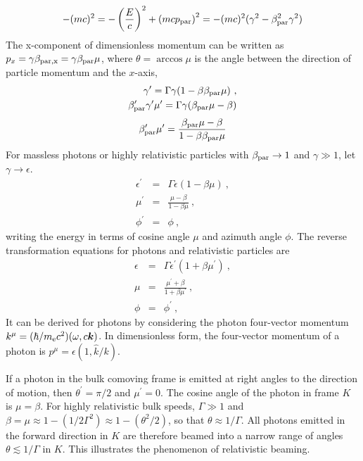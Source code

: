 \documentclass[12pt,a4paper]{article}
\renewcommand{\vec}[1]{\boldsymbol{#1}}
\begin{document}
\begin{equation*}
-(m c)^2 = -\left(\frac{E}{c} \right)^2 +\left(mc p_{\rm par} \right)^2 = -(mc)^2 (\gamma^2 -\beta_{\rm par}^2 \gamma^2)
\end{equation*}
The x-component of dimensionless momentum can be written as $p_x = \gamma \beta_{\rm par,x} = \gamma \beta_{\rm par} \mu$, where $\theta = \arccos \mu$ is the angle between the direction of particle momentum and the $x$-axis,
\begin{eqnarray*}
\gamma^{\prime} = \Gamma \gamma(1-\beta \beta_{\rm par} \mu) ~, \\
\beta^{\prime}_{\rm par} \gamma^{\prime} \mu^{\prime} = \Gamma \gamma (\beta_{\rm par} \mu -\beta)
\end{eqnarray*}
\begin{equation*}
\beta^{\prime}_{\rm par} \mu^{\prime} = \frac{\beta_{\rm par} \mu -\beta}{1-\beta \beta_{\rm par} \mu}
\end{equation*}
For massless photons or highly relativistic particles with $\beta_{\rm par} \rightarrow 1$ and $\gamma \gg 1$, let $\gamma \rightarrow \epsilon$.
\begin{eqnarray}
\epsilon^{\prime} &=& \Gamma \epsilon (1-\beta \mu) ~, \\
\mu^{\prime} &=& \frac{\mu -\beta}{1-\beta\mu} ~, \\
\phi^{\prime} &=& \phi ~,
\end{eqnarray}
writing the energy in terms of cosine angle $\mu$ and azimuth angle $\phi$. The reverse transformation equations for photons and relativistic particles are
\begin{eqnarray}
\epsilon &=& \Gamma \epsilon^{\prime} (1+\beta \mu^{\prime}) ~, \\
\mu &=& \frac{\mu^{\prime} +\beta}{1+\beta\mu^{\prime}} ~, \\
\phi &=& \phi^{\prime} ~,
\end{eqnarray}
It can be derived for photons by considering the photon four-vector momentum $k^\mu = (\hbar/m_{\rm e}c^2)(\omega, c\vec{k})$. In dimensionless form, the four-vector momentum of a photon is $p^\mu = \epsilon(1, \hat{k}/k)$.

If a photon in the bulk comoving frame is emitted at right angles to the direction of motion, then $\theta^{\prime} = \pi/2$ and $\mu^{\prime} = 0$. The cosine angle of the photon in frame $K$ is $\mu = \beta$. For highly relativistic bulk speeds, $\Gamma \gg 1$ and $\beta = \mu \approx 1 - (1/2\Gamma^2) \approx 1 - (\theta^2/2)$, so that $\theta \approx 1/\Gamma$. All photons emitted in the forward direction in $K$ are therefore beamed into a narrow range of angles $\theta \lesssim 1/\Gamma$ in $K$. This illustrates the phenomenon of relativistic beaming.
\end{document}
